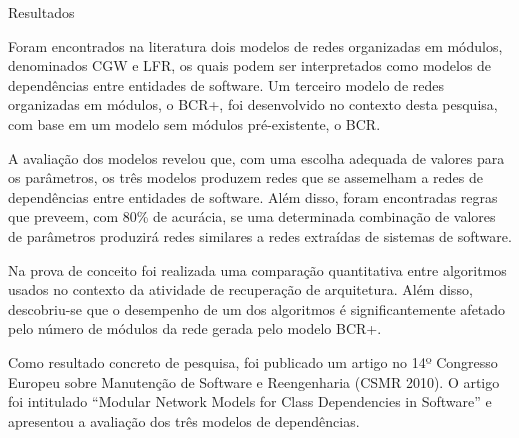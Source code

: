 \begin{section}{Resultados}
	
	Foram encontrados na literatura dois modelos de redes organizadas em módulos, denominados CGW e LFR, os quais podem ser interpretados como modelos de dependências entre entidades de software. Um terceiro modelo de redes organizadas em módulos, o BCR+, foi desenvolvido no contexto desta pesquisa, com base em um modelo sem módulos pré-existente, o BCR. 
	
	A avaliação dos modelos revelou que, com uma escolha adequada de valores para os parâmetros, os três modelos produzem redes que se assemelham a redes de dependências entre entidades de software. Além disso, foram encontradas regras que preveem, com 80\% de acurácia, se uma determinada combinação de valores de parâmetros produzirá redes similares a redes extraídas de sistemas de software.
	
	Na prova de conceito foi realizada uma comparação quantitativa entre algoritmos usados no contexto da atividade de recuperação de arquitetura. Além disso, descobriu-se que o desempenho de um dos algoritmos é significantemente afetado pelo número de módulos da rede gerada pelo modelo BCR+.
	
	Como resultado concreto de pesquisa, foi publicado um artigo no 14º Congresso Europeu sobre Manutenção de Software e Reengenharia (CSMR 2010). O artigo foi intitulado ``Modular Network Models for Class Dependencies in Software'' e apresentou a avaliação dos três modelos de dependências.

	
\end{section}


